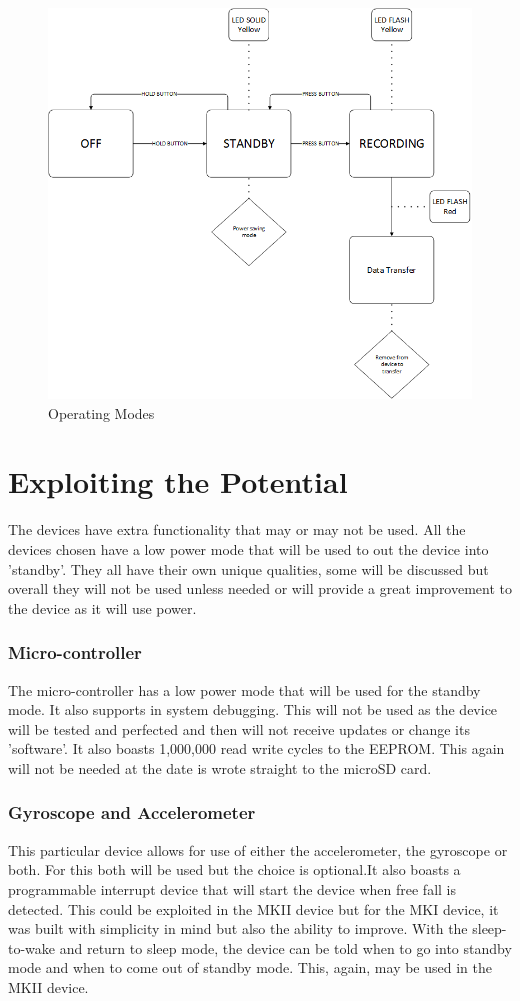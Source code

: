 \documentclass{report}
\begin{document}
\begin{figure}[ht!]
\centering
\includegraphics[width=115mm]{ImageFlow.png}
\caption{Operating Modes}
\label{overflow}
\end{figure}

\section{Exploiting the Potential}
 
 The devices have extra functionality that may or may not be used. All the devices chosen have a low power mode that will be used to out the device into 'standby'. They all have their own unique qualities, some will be discussed but overall they will not be used unless needed or will provide a great improvement to the device as it will use power.
 
\subsubsection{Micro-controller}
The micro-controller has a low power mode that will be used for the standby mode. It also supports in system debugging. This will not be used as the device will be tested and perfected and then will not receive updates or change its 'software'. It also boasts 1,000,000 read write cycles to the EEPROM. This again will not be needed at the date is wrote straight to the microSD card.

\subsubsection{Gyroscope and Accelerometer}
This particular device allows for use of either the accelerometer, the gyroscope or both. For this both will be used but the choice is optional.It also boasts a programmable interrupt device that will start the device when free fall is detected. This could be exploited in the MKII device but for the MKI device, it was built with simplicity in mind but also the ability to improve. With the sleep-to-wake and return to sleep mode, the device can be told when to go into standby mode and when to come out of standby mode. This, again, may be used in the MKII device. 
\end{document}
